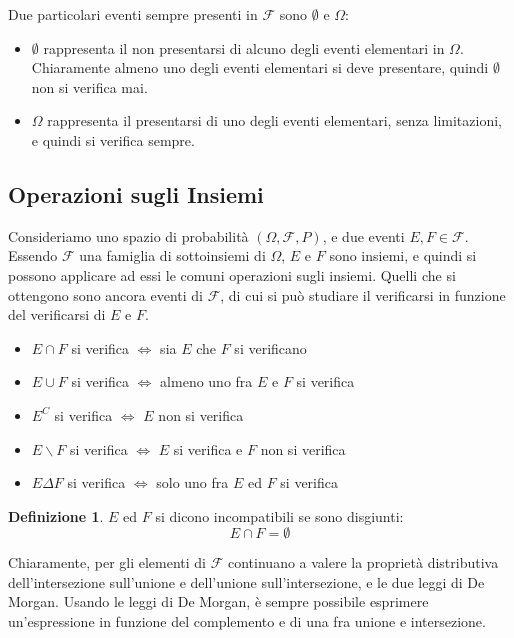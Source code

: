 \documentclass{article}
\theoremstyle{plain}
\theoremstyle{definition}
\newtheorem{definizione}{Definizione}[section]
\theoremstyle{remark}
\begin{document}
Due particolari eventi sempre presenti in $\mathscr{F}$ sono $\emptyset$ e $\Omega$:
\begin{itemize}
	\item $\emptyset$ rappresenta il non presentarsi di alcuno degli eventi elementari in $\Omega$. Chiaramente almeno uno degli eventi elementari si deve presentare, quindi $\emptyset$ non si verifica mai.
	\item $\Omega$ rappresenta il presentarsi di uno degli eventi elementari, senza limitazioni, e quindi si verifica sempre.
\end{itemize}
\subsection{Operazioni sugli Insiemi} %
\label{sub:operazioni_sugli_insiemi}
Consideriamo uno spazio di probabilità $(\Omega,\mathscr{F},P)$, e due eventi $E,F\in\mathscr{F}$. Essendo $\mathscr{F}$ una famiglia di sottoinsiemi di $\Omega$, $E$ e $F$ sono insiemi, e quindi si possono applicare ad essi le comuni operazioni sugli insiemi. Quelli che si ottengono sono ancora eventi di $\mathscr{F}$, di cui si può studiare il verificarsi in funzione del verificarsi di $E$ e $F$.
\begin{itemize}
	\item $E\cap F$ si verifica $\Leftrightarrow$ sia $E$ che $F$ si verificano
	\item $E\cup F$ si verifica $\Leftrightarrow$ almeno uno fra $E$ e $F$ si verifica
	\item $E^C$ si verifica $\Leftrightarrow$ $E$ non si verifica
	\item $E\smallsetminus F$ si verifica $\Leftrightarrow$ $E$ si verifica e $F$ non si verifica
	\item $E\Delta F$ si verifica $\Leftrightarrow$ solo uno fra $E$ ed $F$ si verifica
\end{itemize}
\begin{definizione}
	$E$ ed $F$ si dicono incompatibili se sono disgiunti:
	\begin{equation*}
		E\cap F=\emptyset
	\end{equation*}
\end{definizione}
Chiaramente, per gli elementi di $\mathscr{F}$ continuano a valere la proprietà distributiva dell'intersezione sull'unione e dell'unione sull'intersezione, e le due leggi di De Morgan. Usando le leggi di De Morgan, è sempre possibile esprimere un'espressione in funzione del complemento e di una fra unione e intersezione.
\end{document}
